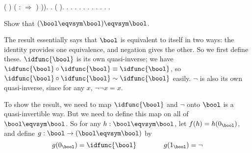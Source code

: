 \begin{coqdoccode}
\coqdocindent{9.50em}
 ( )    (  :    \ensuremath{\Rightarrow}   ) \coqdocnotation{))} \coqdoceol
\coqdocindent{2.00em}
\coqdocnotation{=} \coqdoceol
\coqdocindent{1.00em}
)).\coqdoceol
\coqdocindent{1.00em}
 \coqdocnotation{(} .\coqdoceol
\coqdocindent{1.00em}
 (\coqdocnotation{(}  \coqdocvar{\_}\coqdocnotation{)}  \coqdocvar{\_}).  .\coqdoceol
\coqdocindent{1.00em}
 . .\coqdoceol
\coqdocindent{1.00em}
\coqdoctac{\ensuremath{\exists}} . .\coqdoceol
\coqdocindent{1.00em}
 . .\coqdoceol
\coqdocindent{1.00em}
. .\coqdoceol
\coqdocnoindent
{}.\coqdoceol
\coqdocemptyline
\coqdocnoindent
{} .\coqdoceol
\coqdocemptyline
\end{coqdoccode}
Show that $(\bool \eqvsym \bool) \eqvsym \bool$.


 \soln
The result essentially says that $\bool$ is equivalent to itself in two ways:
the identity provides one equivalence, and negation gives the other.  So we
first define these.  $\idfunc{\bool}$ is its own quasi-inverse; we have
$\idfunc{\bool} \circ \idfunc{\bool} \equiv \idfunc{\bool}$, so $\idfunc{\bool}
\circ \idfunc{\bool}
\sim \idfunc{\bool}$ easily.  $\lnot$ is also its own quasi-inverse, since for
any $x$, $\lnot\lnot x = x$.


To show the result, we need to map $\idfunc{\bool}$ and $\lnot$ onto $\bool$ is
a quasi-invertible way.  But we need to define this map on all of $\bool
\eqvsym \bool$.  So for any $h : \bool\eqvsym\bool$, let $f(h) = h(0_{\bool})$,
and define $g : \bool \to (\bool \eqvsym \bool)$ by
\[
  g(0_{\bool}) = \idfunc{\bool} 
  \qquad\qquad
  g(1_{\bool}) = \lnot
\]



